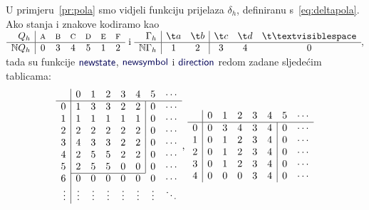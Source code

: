 \begin{primjer}[{name=[kodirana tablica prijelaza]}]\label{pr:polatable}
U primjeru~\ref{pr:pola} smo vidjeli funkciju prijelaza $\delta_h$, definiranu s~\eqref{eq:deltapola}. Ako stanja i znakove kodiramo kao
$
    \begin{array}{r|cccccc}
         Q_h& \textsc a& \textsc b& \textsc c& \textsc d& \textsc e& \textsc f \\\hline
         \N Q_h& 0 & 3 & 4 & 5 & 1 & 2
    \end{array}\text{ i }
    \begin{array}{r|cc|ccc}
        \Gamma_h& \t a & \t b & \t c & \t d & \bl \\\hline
        \N\Gamma_h & 1 & 2 & 3 & 4 & 0
    \end{array}\text,
    $
tada su funkcije $\f{newstate}$, $\f{newsymbol}$ i $\f{direction}$ redom zadane sljedećim tablicama:
\begin{equation*}
\begin{array}{r|ccccccc}
    &0&1&2&3&4&5&\cdots\\\hline
0& 1 & 3 & 3 & 2 & 2 & \multicolumn{1}{|c}{0} & \cdots\\
1& 1 & 1 & 1 & 1 & 1 & \multicolumn{1}{|c}{0} & \cdots\\
2& 2 & 2 & 2 & 2 & 2 & \multicolumn{1}{|c}{0} & \cdots\\
3& 4 & 3 & 3 & 2 & 2 & \multicolumn{1}{|c}{0} & \cdots\\
4& 2 & 5 & 5 & 2 & 2 & \multicolumn{1}{|c}{0} & \cdots\\
5& 2 & 5 & 5 & 0 & 0 & \multicolumn{1}{|c}{0} & \cdots\\ \cline{2-6}
6& 0 & 0 & 0 & 0 & 0 & 0 & \cdots\\
\vdots&\vdots&\vdots&\vdots&\vdots&\vdots&\vdots&\ddots
\end{array}\text,\;
\begin{array}{r|ccccccc}
    &0&1&2&3&4&5&\cdots\\\hline
0& 0 & 3 & 4 & 3 & 4 & \multicolumn{1}{|c}{0} & \cdots\\
1& 0 & 1 & 2 & 3 & 4 & \multicolumn{1}{|c}{0} & \cdots\\
2& 0 & 1 & 2 & 3 & 4 & \multicolumn{1}{|c}{0} & \cdots\\
3& 0 & 1 & 2 & 3 & 4 & \multicolumn{1}{|c}{0} & \cdots\\
4& 0 & 0 & 0 & 3 & 4 & \multicolumn{1}{|c}{0} & \cdots\\

\end{array}
\end{equation*}
\end{primjer}
